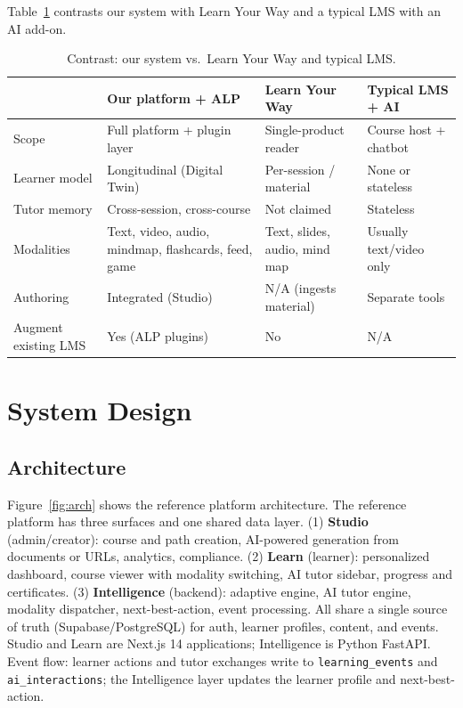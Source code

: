 \documentclass[10pt,twocolumn]{article}
\begin{document}
Table~\ref{tab:comparison} contrasts our system with Learn Your Way and a typical LMS with an AI add-on.

\begin{table}[t]
\centering
\caption{Contrast: our system vs.\ Learn Your Way and typical LMS.}
\label{tab:comparison}
\small
\begin{tabular}{@{}llll@{}}
\toprule
 & Our platform + ALP & Learn Your Way & Typical LMS + AI \\
\midrule
Scope & Full platform + plugin layer & Single-product reader & Course host + chatbot \\
Learner model & Longitudinal (Digital Twin) & Per-session / material & None or stateless \\
Tutor memory & Cross-session, cross-course & Not claimed & Stateless \\
Modalities & Text, video, audio, mindmap, flashcards, feed, game & Text, slides, audio, mind map & Usually text/video only \\
Authoring & Integrated (Studio) & N/A (ingests material) & Separate tools \\
Augment existing LMS & Yes (ALP plugins) & No & N/A \\
\bottomrule
\end{tabular}
\end{table}

\section{System Design}
\label{sec:design}

\subsection{Architecture}
\label{sec:arch}

Figure~\ref{fig:arch} shows the reference platform architecture. The reference platform has three surfaces and one shared data layer. (1) \textbf{Studio} (admin/creator): course and path creation, AI-powered generation from documents or URLs, analytics, compliance. (2) \textbf{Learn} (learner): personalized dashboard, course viewer with modality switching, AI tutor sidebar, progress and certificates. (3) \textbf{Intelligence} (backend): adaptive engine, AI tutor engine, modality dispatcher, next-best-action, event processing. All share a single source of truth (Supabase/PostgreSQL) for auth, learner profiles, content, and events. Studio and Learn are Next.js 14 applications; Intelligence is Python FastAPI. Event flow: learner actions and tutor exchanges write to \texttt{learning\_events} and \texttt{ai\_interactions}; the Intelligence layer updates the learner profile and next-best-action.
\end{document}

